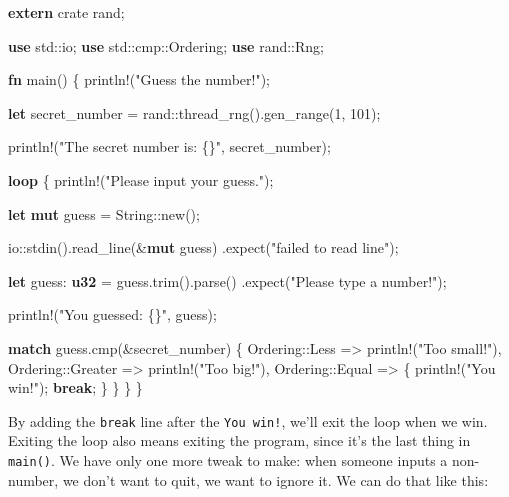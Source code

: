 \documentclass[a4paper,]{book}
\newenvironment{Shaded}{\begin{snugshade}}{\end{snugshade}}
\newcommand{\KeywordTok}[1]{\textcolor[rgb]{0.13,0.29,0.53}{\textbf{{#1}}}}
\newcommand{\DecValTok}[1]{\textcolor[rgb]{0.00,0.00,0.81}{{#1}}}
\newcommand{\StringTok}[1]{\textcolor[rgb]{0.31,0.60,0.02}{{#1}}}
\newcommand{\OtherTok}[1]{\textcolor[rgb]{0.56,0.35,0.01}{{#1}}}
\newcommand{\NormalTok}[1]{{#1}}
\begin{document}
\begin{Shaded}
\begin{Highlighting}[]
\KeywordTok{extern} \NormalTok{crate rand;}

\KeywordTok{use} \NormalTok{std::io;}
\KeywordTok{use} \NormalTok{std::cmp::Ordering;}
\KeywordTok{use} \NormalTok{rand::Rng;}

\KeywordTok{fn} \NormalTok{main() \{}
    \OtherTok{println!}\NormalTok{(}\StringTok{"Guess the number!"}\NormalTok{);}

    \KeywordTok{let} \NormalTok{secret_number = rand::thread_rng().gen_range(}\DecValTok{1}\NormalTok{, }\DecValTok{101}\NormalTok{);}

    \OtherTok{println!}\NormalTok{(}\StringTok{"The secret number is: \{\}"}\NormalTok{, secret_number);}

    \KeywordTok{loop} \NormalTok{\{}
        \OtherTok{println!}\NormalTok{(}\StringTok{"Please input your guess."}\NormalTok{);}

        \KeywordTok{let} \KeywordTok{mut} \NormalTok{guess = String::new();}

        \NormalTok{io::stdin().read_line(&}\KeywordTok{mut} \NormalTok{guess)}
            \NormalTok{.expect(}\StringTok{"failed to read line"}\NormalTok{);}

        \KeywordTok{let} \NormalTok{guess: }\KeywordTok{u32} \NormalTok{= guess.trim().parse()}
            \NormalTok{.expect(}\StringTok{"Please type a number!"}\NormalTok{);}

        \OtherTok{println!}\NormalTok{(}\StringTok{"You guessed: \{\}"}\NormalTok{, guess);}

        \KeywordTok{match} \NormalTok{guess.cmp(&secret_number) \{}
            \NormalTok{Ordering::Less    => }\OtherTok{println!}\NormalTok{(}\StringTok{"Too small!"}\NormalTok{),}
            \NormalTok{Ordering::Greater => }\OtherTok{println!}\NormalTok{(}\StringTok{"Too big!"}\NormalTok{),}
            \NormalTok{Ordering::Equal   => \{}
                \OtherTok{println!}\NormalTok{(}\StringTok{"You win!"}\NormalTok{);}
                \KeywordTok{break}\NormalTok{;}
            \NormalTok{\}}
        \NormalTok{\}}
    \NormalTok{\}}
\NormalTok{\}}
\end{Highlighting}
\end{Shaded}

By adding the \texttt{break} line after the \texttt{You\ win!}, we'll
exit the loop when we win. Exiting the loop also means exiting the
program, since it's the last thing in \texttt{main()}. We have only one
more tweak to make: when someone inputs a non-number, we don't want to
quit, we want to ignore it. We can do that like this:
\end{document}
